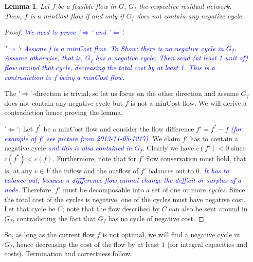 \documentclass{article}
\newtheorem{lemma}{Lemma}
\begin{document}
\begin{lemma}
Let $f$ be a feasible flow in $G$, $G_f$ the respective residual network. Then, $f$ is a minCost flow if and only if $G_f$ does not contain any negative cycle.
\end{lemma}
\begin{proof}
\textcolor{blue}{\emph{We need to prove '$\Rightarrow$' and '$\Leftarrow$'.}}

\textcolor{blue}{\emph{'$\Rightarrow$': Assume f is a minCost flow. To Show: there is no negative cycle in $G_f$. Assume otherwise, that is, $G_f$ has a negative cycle. Then send (at least 1 unit of) flow around that cycle, decreasing the total cost by at least 1. This is a contradiction to $f$ being a minCost flow.}}


The '$\Rightarrow$'-direction is trivial, so let us focus on the other direction and assume $G_f$ does not contain any negative cycle but $f$ is not a minCost flow. We will derive a contradiction hence proving the lemma.

'$\Leftarrow$': Let $f^*$ be a minCost flow and consider the flow difference $f'=f^*-f$  \textcolor{blue}{\emph{(for example of $f'$ see picture from 2013-11-05-1217)}}. We claim $f'$ has to contain a negative cycle  \textcolor{blue}{\emph{and this is also contained in $G_f$}}. Clearly we have $c(f')<0$ since $c(f^*)<c(f)$. Furthermore, note that for $f'$ flow conservation must hold, that is, at any $v\in V$ the inflow and the outflow of $f'$ balances out to $0$. \textcolor{blue}{\emph{It has to balance out, because a diffference flow cannot change the defficit or surplus of a node.}} Therefore, $f'$ must be decomposable into a set of one or more \emph{cycles}. Since the total cost of the cycles is negative, one of the cycles must have negative cost. Let that cycle be $C$; note that the flow described by $C$ can also be sent around in $G_f$, contradicting the fact that $G_f$ has no cycle of negative cost.
\end{proof}

So, as long as the current flow $f$ is not optimal, we will find a negative cycle in $G_f$, hence decreasing the cost of the flow by at least $1$ (for integral capacities and costs). Termination and correctness follow.
\end{document}

